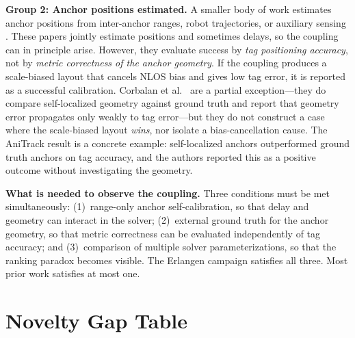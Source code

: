 \documentclass[11pt,a4paper]{article}
\begin{document}
\textbf{Group 2: Anchor positions estimated.} A smaller body of work estimates
anchor positions from inter-anchor ranges, robot trajectories, or auxiliary sensing
\citep{hamer_2018_self_calibrating_ultra_wideband_network,ridolfi_2021_self_calibration_and_collaborati,herbruggen_2023_multihop_self_calibration_algori,piavanini_2022_a_calibration_method_for}.
These papers jointly estimate positions and sometimes delays, so the coupling can
in principle arise. However, they evaluate success by \emph{tag positioning accuracy},
not by \emph{metric correctness of the anchor geometry}. If the coupling produces a
scale-biased layout that cancels NLOS bias and gives low tag error, it is reported as
a successful calibration. Corbalan et al.\
\citep{corbalan_2023_self_localization_uwb_anchors} are a partial exception---they do
compare self-localized geometry against ground truth and report that geometry error
propagates only weakly to tag error---but they do not construct a case where the
scale-biased layout \emph{wins}, nor isolate a bias-cancellation cause. The
AniTrack result \citep{luder_2025_anitrack} is a
concrete example: self-localized anchors outperformed ground truth anchors on tag
accuracy, and the authors reported this as a positive outcome without
investigating the geometry.

\textbf{What is needed to observe the coupling.} Three conditions must be met
simultaneously: (1)~range-only anchor self-calibration, so that delay and geometry
can interact in the solver; (2)~external ground truth for the anchor geometry, so
that metric correctness can be evaluated independently of tag accuracy; and
(3)~comparison of multiple solver parameterizations, so that the ranking paradox
becomes visible. The Erlangen campaign satisfies all three. Most prior work
satisfies at most one.

\section{Novelty Gap Table}
\end{document}
